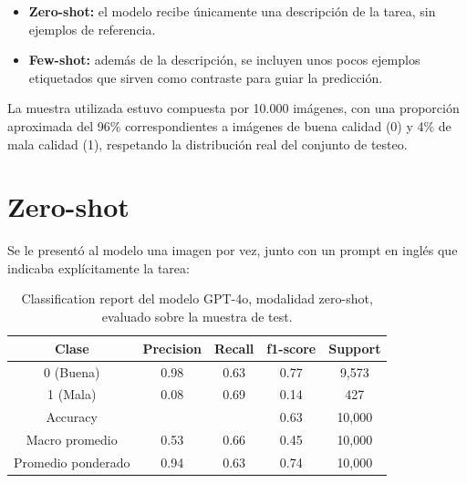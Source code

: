 \begin{itemize}
	\item \textbf{Zero-shot:} el modelo recibe únicamente una descripción de la tarea, sin ejemplos de referencia.
	\item \textbf{Few-shot:} además de la descripción, se incluyen unos pocos ejemplos etiquetados que sirven como contraste para guiar la predicción.
\end{itemize}

La muestra utilizada estuvo compuesta por 10.000 imágenes, con una proporción aproximada del 96\% correspondientes a imágenes de buena calidad (0) y 4\% de mala calidad (1), respetando la distribución real del conjunto de testeo.

\section{Zero-shot}
Se le presentó al modelo una imagen por vez, junto con un prompt en inglés que indicaba explícitamente la tarea:

\begin{table}[H]
	\renewcommand{\arraystretch}{3}
	\caption{Prompt usado para clasificación zero-shot con GPT-4o.}
	\label{tab:promtZeroShot}
\end{table}

\begin{table}[H]
	\centering
	\renewcommand{\arraystretch}{1.5}
	\begin{tabular}{ ||ccccc||  }
		\hline
		\textbf{Clase} & \textbf{Precision} & \textbf{Recall} & \textbf{f1-score} & \textbf{Support} \\
		\hline
		0 (Buena) & 0.98 & 0.63 & 0.77 & 9,573 \\
		\hline
		1 (Mala) & 0.08 & 0.69 & 0.14 & 427 \\
		\hline
		Accuracy &  &  & 0.63 & 10,000 \\
		\hline
		Macro promedio & 0.53 & 0.66 & 0.45 & 10,000 \\
		\hline
		Promedio ponderado & 0.94 & 0.63 & 0.74 & 10,000 \\
		\hline
	\end{tabular}
	\caption{Classification report del modelo GPT-4o, modalidad zero-shot, evaluado sobre la muestra de test.}
	\label{tab:evaluacionZeroShot}
\end{table}

